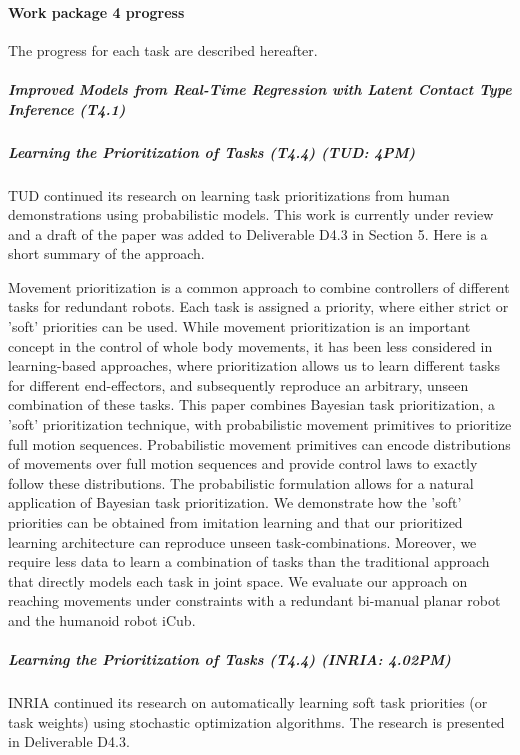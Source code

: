 

\paragraph{Work package 4 progress}

The progress for each task are described hereafter.

\subparagraph*{Improved Models from Real-Time Regression with Latent Contact Type Inference (T4.1)}



\subparagraph{Learning the Prioritization of Tasks (T4.4) (TUD: 4PM)}

TUD continued its research on learning task prioritizations from human demonstrations using probabilistic models. This work is currently under review and 
a draft of the paper was added to Deliverable D4.3 in Section 5.  Here is a short summary of the approach. 

Movement prioritization is a common approach
to combine controllers of different tasks for redundant robots.
Each task is assigned a priority, where either strict or 'soft'
priorities can be used. While movement prioritization is an
important concept in the control of whole body movements, it
has been less considered in learning-based approaches, where
prioritization allows us to learn different tasks for different
end-effectors, and subsequently reproduce an arbitrary, unseen
combination of these tasks. This paper combines Bayesian task
prioritization, a 'soft' prioritization technique, with probabilistic
movement primitives to prioritize full motion sequences.
Probabilistic movement primitives can encode distributions of
movements over full motion sequences and provide control
laws to exactly follow these distributions. The probabilistic
formulation allows for a natural application of Bayesian task
prioritization. We demonstrate how the 'soft' priorities can
be obtained from imitation learning and that our prioritized
learning architecture can reproduce unseen task-combinations.
Moreover, we require less data to learn a combination of tasks
than the traditional approach that directly models each task in
joint space. We evaluate our approach on reaching movements
under constraints with a redundant bi-manual planar robot
and the humanoid robot iCub. 

\subparagraph{Learning the Prioritization of Tasks (T4.4) (INRIA: 4.02PM)}

INRIA continued its research on automatically learning soft task priorities (or task weights) using stochastic optimization algorithms. The research is presented in Deliverable D4.3. 

